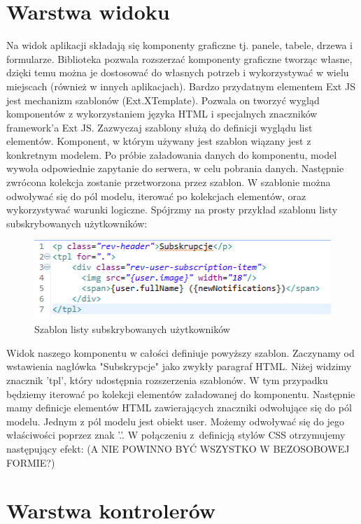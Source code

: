 \section{Warstwa widoku}

Na widok aplikacji składają się komponenty graficzne tj. panele, tabele, drzewa i formularze. Biblioteka pozwala rozszerzać komponenty graficzne tworząc własne, dzięki temu można je dostosować do własnych potrzeb i wykorzystywać w wielu miejscach (również w innych aplikacjach). Bardzo przydatnym elementem Ext JS jest mechanizm szablonów (Ext.XTemplate). Pozwala on tworzyć wygląd komponentów z wykorzystaniem języka HTML i specjalnych znaczników framework'a Ext JS. Zazwyczaj szablony służą do definicji wyglądu list elementów. Komponent, w którym używany jest szablon wiązany jest z konkretnym modelem. Po próbie załadowania danych do komponentu, model wywoła odpowiednie zapytanie do serwera, w celu pobrania danych. Następnie zwrócona kolekcja zostanie przetworzona przez szablon. W szablonie można odwoływać się do pól modelu, iterować po kolekcjach elementów, oraz wykorzystywać warunki logiczne. Spójrzmy na prosty przykład szablonu listy subskrybowanych użytkowników:
 
\begin{figure}[H]
	\centering
	\includegraphics[width=\textwidth]{images/tpl.png}
	\caption{Szablon listy subskrybowanych użytkowników}
\end{figure}

Widok naszego komponentu w całości definiuje powyższy szablon. Zaczynamy od wstawienia nagłówka "Subskrypcje" jako zwykły paragraf HTML. Niżej widzimy znacznik 'tpl', który udostępnia rozszerzenia szablonów. W tym przypadku będziemy iterować po kolekcji elementów załadowanej do komponentu. Następnie mamy definicje elementów HTML zawierających znaczniki odwołujące się do pól modelu. Jednym z pól modelu jest obiekt user. Możemy odwoływać się do jego właściwości poprzez znak '.'. W połączeniu z~definicją stylów CSS otrzymujemy następujący efekt: (A NIE POWINNO BYĆ WSZYSTKO W BEZOSOBOWEJ FORMIE?)

 


\section{Warstwa kontrolerów}


